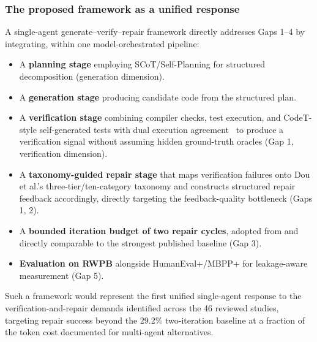 \documentclass[10pt,a4paper]{article}
\begin{document}
\subsubsection*{The proposed framework as a unified response}
A single-agent generate--verify--repair framework directly addresses Gaps 1--4 by integrating, within one model-orchestrated pipeline:
\begin{itemize}[leftmargin=*]
\item A \textbf{planning stage} employing SCoT/Self-Planning for structured decomposition \cite{li2025scot,jiang2024selfplan} (generation dimension).
\item A \textbf{generation stage} producing candidate code from the structured plan.
\item A \textbf{verification stage} combining compiler checks, test execution, and CodeT-style self-generated tests with dual execution agreement~\cite{chenbei2023} to produce a verification signal without assuming hidden ground-truth oracles (Gap 1, verification dimension).
\item A \textbf{taxonomy-guided repair stage} that maps verification failures onto Dou et al.'s three-tier/ten-category taxonomy \cite{dou2026} and constructs structured repair feedback accordingly, directly targeting the feedback-quality bottleneck (Gaps 1, 2).
\item A \textbf{bounded iteration budget of two repair cycles}, adopted from and directly comparable to the strongest published baseline \cite{dou2026} (Gap 3).
\item \textbf{Evaluation on RWPB} alongside HumanEval+/MBPP+ for leakage-aware measurement (Gap 5).
\end{itemize}
Such a framework would represent the first unified single-agent response to the verification-and-repair demands identified across the 46 reviewed studies, targeting repair success beyond the 29.2\% two-iteration baseline at a fraction of the token cost documented for multi-agent alternatives.
\end{document}
